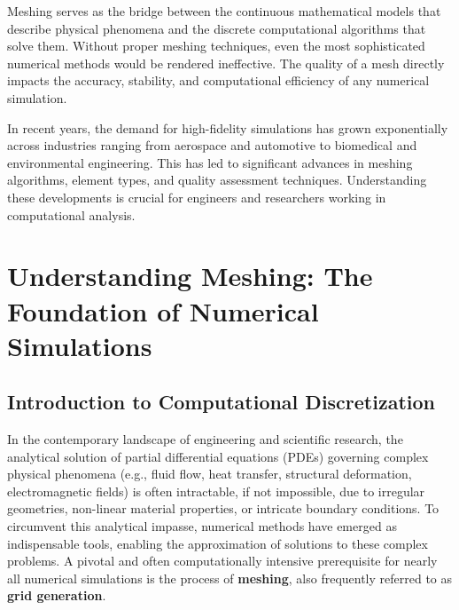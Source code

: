 \documentclass{book}
\begin{document}
Meshing serves as the bridge between the continuous mathematical models that describe physical phenomena and the discrete computational algorithms that solve them. Without proper meshing techniques, even the most sophisticated numerical methods would be rendered ineffective. The quality of a mesh directly impacts the accuracy, stability, and computational efficiency of any numerical simulation.

In recent years, the demand for high-fidelity simulations has grown exponentially across industries ranging from aerospace and automotive to biomedical and environmental engineering. This has led to significant advances in meshing algorithms, element types, and quality assessment techniques. Understanding these developments is crucial for engineers and researchers working in computational analysis.

\chapter{Understanding Meshing: The Foundation of Numerical Simulations}

\begin{abstract}
This chapter provides an exhaustive and highly detailed exposition of meshing, a foundational process in computational simulations across diverse engineering and scientific disciplines, including Finite Element Analysis (FEA), Computational Fluid Dynamics (CFD), and various other numerical methods. It delves deeply into the theoretical underpinnings, practical implications, and advanced considerations of mesh generation. Topics covered include the precise definition, overarching purpose, classification of mesh types, an in-depth analysis of element characteristics, rigorous quality assessment metrics, and a comprehensive breakdown of the meshing workflow, encompassing geometry preparation, algorithmic approaches, and post-meshing validation. Special attention is given to the interplay between mesh characteristics and simulation accuracy, convergence, and computational efficiency.
\end{abstract}

\section{Introduction to Computational Discretization}

In the contemporary landscape of engineering and scientific research, the analytical solution of partial differential equations (PDEs) governing complex physical phenomena (e.g., fluid flow, heat transfer, structural deformation, electromagnetic fields) is often intractable, if not impossible, due to irregular geometries, non-linear material properties, or intricate boundary conditions. To circumvent this analytical impasse, numerical methods have emerged as indispensable tools, enabling the approximation of solutions to these complex problems. A pivotal and often computationally intensive prerequisite for nearly all numerical simulations is the process of \textbf{meshing}, also frequently referred to as \textbf{grid generation}.
\end{document}
